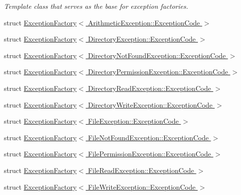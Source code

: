 \begin{DoxyCompactItemize}
\begin{DoxyCompactList}\small\item\em Template class that serves as the base for exception factories. \end{DoxyCompactList}\item 
struct \hyperlink{structMezzanine_1_1ExceptionFactory_3_01ArithmeticException_1_1ExceptionCode_01_4}{Exception\-Factory$<$ Arithmetic\-Exception\-::\-Exception\-Code $>$}
\item 
struct \hyperlink{structMezzanine_1_1ExceptionFactory_3_01DirectoryException_1_1ExceptionCode_01_4}{Exception\-Factory$<$ Directory\-Exception\-::\-Exception\-Code $>$}
\item 
struct \hyperlink{structMezzanine_1_1ExceptionFactory_3_01DirectoryNotFoundException_1_1ExceptionCode_01_4}{Exception\-Factory$<$ Directory\-Not\-Found\-Exception\-::\-Exception\-Code $>$}
\item 
struct \hyperlink{structMezzanine_1_1ExceptionFactory_3_01DirectoryPermissionException_1_1ExceptionCode_01_4}{Exception\-Factory$<$ Directory\-Permission\-Exception\-::\-Exception\-Code $>$}
\item 
struct \hyperlink{structMezzanine_1_1ExceptionFactory_3_01DirectoryReadException_1_1ExceptionCode_01_4}{Exception\-Factory$<$ Directory\-Read\-Exception\-::\-Exception\-Code $>$}
\item 
struct \hyperlink{structMezzanine_1_1ExceptionFactory_3_01DirectoryWriteException_1_1ExceptionCode_01_4}{Exception\-Factory$<$ Directory\-Write\-Exception\-::\-Exception\-Code $>$}
\item 
struct \hyperlink{structMezzanine_1_1ExceptionFactory_3_01FileException_1_1ExceptionCode_01_4}{Exception\-Factory$<$ File\-Exception\-::\-Exception\-Code $>$}
\item 
struct \hyperlink{structMezzanine_1_1ExceptionFactory_3_01FileNotFoundException_1_1ExceptionCode_01_4}{Exception\-Factory$<$ File\-Not\-Found\-Exception\-::\-Exception\-Code $>$}
\item 
struct \hyperlink{structMezzanine_1_1ExceptionFactory_3_01FilePermissionException_1_1ExceptionCode_01_4}{Exception\-Factory$<$ File\-Permission\-Exception\-::\-Exception\-Code $>$}
\item 
struct \hyperlink{structMezzanine_1_1ExceptionFactory_3_01FileReadException_1_1ExceptionCode_01_4}{Exception\-Factory$<$ File\-Read\-Exception\-::\-Exception\-Code $>$}
\item 
struct \hyperlink{structMezzanine_1_1ExceptionFactory_3_01FileWriteException_1_1ExceptionCode_01_4}{Exception\-Factory$<$ File\-Write\-Exception\-::\-Exception\-Code $>$}

\end{DoxyCompactItemize}
